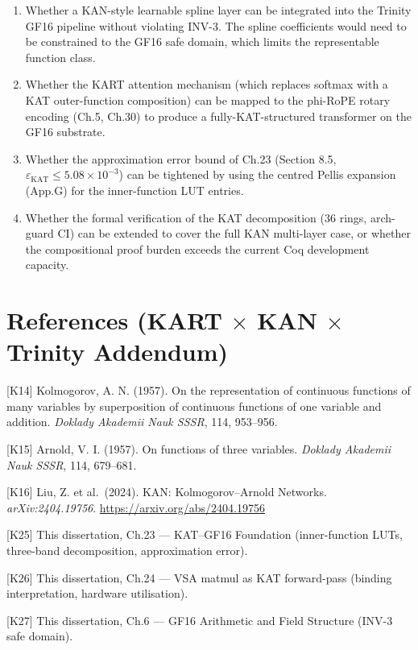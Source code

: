\begin{enumerate}
\item Whether a KAN-style learnable spline layer
can be integrated into the Trinity GF16 pipeline
without violating INV-3. The spline coefficients
would need to be constrained to the GF16 safe
domain, which limits the representable function
class.

\item Whether the KART attention mechanism (which
replaces softmax with a KAT outer-function
composition) can be mapped to the phi-RoPE rotary
encoding (Ch.5, Ch.30) to produce a
fully-KAT-structured transformer on the GF16
substrate.

\item Whether the approximation error bound of
Ch.23 (Section 8.5,
\(\varepsilon_{\mathrm{KAT}} \leq 5.08 \times
10^{-3}\)) can be tightened by using the
centred Pellis expansion (App.G) for the
inner-function LUT entries.

\item Whether the formal verification of the KAT
decomposition (36 rings, arch-guard CI) can be
extended to cover the full KAN multi-layer case,
or whether the compositional proof burden exceeds
the current Coq development capacity.
\end{enumerate}

\section{References (KART $\times$ KAN $\times$ Trinity
Addendum)}\label{fa_27:references-kart-kan}

[K14] Kolmogorov, A. N. (1957). On the
representation of continuous functions of many
variables by superposition of continuous functions
of one variable and addition.
\emph{Doklady Akademii Nauk SSSR}, 114, 953--956.

[K15] Arnold, V. I. (1957). On functions of three
variables. \emph{Doklady Akademii Nauk SSSR},
114, 679--681.

[K16] Liu, Z. et al.~(2024). KAN: Kolmogorov--Arnold
Networks. \emph{arXiv:2404.19756}.
\url{https://arxiv.org/abs/2404.19756}

[K25] This dissertation, Ch.23 --- KAT--GF16
Foundation (inner-function LUTs, three-band
decomposition, approximation error).

[K26] This dissertation, Ch.24 --- VSA matmul as
KAT forward-pass (binding interpretation, hardware
utilisation).

[K27] This dissertation, Ch.6 --- GF16 Arithmetic
and Field Structure (INV-3 safe domain).

